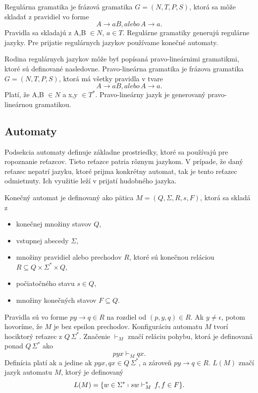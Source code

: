 \begin{definition}
Regulárna gramatika je frázová gramatika $G = (N,T,P,S)$, ktorá sa môže skladať z pravidiel vo forme $$A \rightarrow aB , alebo \, A \rightarrow a.$$ Pravidla sa skladajú z A,B $ \in N$, $a \in T$. Regulárne gramatiky generujú regulárne jazyky. Pre prijatie regulárnych jazykov používame konečné automaty.
\end{definition}

\begin{definition}
\label{def:pravolin}
Rodina regulárnych jazykov môže byť popísaná pravo-lineárnimi gramatikmi, ktoré sú definované nasledovne. Pravo-lineárna gramatika je frázova gramatika $G = (N,T,P,S)$, ktorá má všetky pravidla v tvare $$A \rightarrow aB, alebo \, A \rightarrow a.$$ Platí, že A,B $ \in N$ a x,y $ \in T^*$. Pravo-lineárny jazyk je generovaný pravo-lineárnou gramatikou.
\end{definition}

\subsection{Automaty}
Podsekcia automaty definuje základne prostriedky, ktoré sa používajú pre ropoznanie reťazcov. Tieto reťazce patria rôznym jazykom. V prípade, že daný reťazec nepatrí jazyku, ktoré prijma konkrétny automat, tak je tento reťazec odmietnuty. Ich využitie leží v prijatí hudobného jazyka.

\begin{definition}
\label{def:endaut}
Konečný automat je definovaný ako pätica $M = (Q,\Sigma,R,s,F)$, ktorá sa skladá z
\begin{itemize}\itemsep0.05em
    \item konečnej množiny stavov $Q$,
    \item vstupnej abecedy $\Sigma$,
    \item množiny pravidiel alebo prechodov $R$, ktoré sú konečnou reláciou $R \subseteq Q \times \Sigma^* \times Q$,
    \item počiatočného stavu $s \in Q$,
    \item množiny konečných stavov $F \subseteq Q$.
\end{itemize}

Pravidla sú vo forme $py \rightarrow q \in R$ na rozdiel od $(p,y,q) \in R$. Ak $y \neq \epsilon$, potom hovoríme, že $M$ je bez epsilon prechodov. Konfiguráciu automatu $M$ tvorí hociktorý reťazec z $Q \, \Sigma^*$. Značenie $\vdash_M$ značí reláciu pohybu, ktorá je definovaná ponad $Q \, \Sigma^*$ ako $$pyx \vdash_M qx.$$ Definícia platí ak a jedine ak $pyx, qx \in Q \, \Sigma^*$, a zároveň $py \rightarrow q \in R$. $L(M)$ značí jazyk automatu $M$, ktorý je  definovaný $$L(M) = \{w \in \Sigma^* \shortmid sw \vdash_M^* \, f, f \in F\}.$$
\end{definition}

